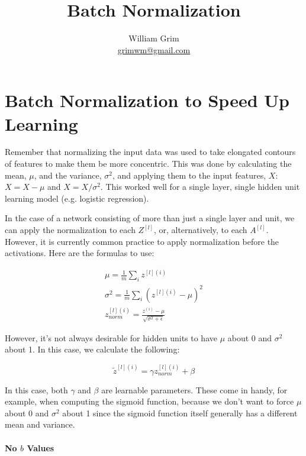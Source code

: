 \documentclass{article}
\begin{document}
\title {Batch Normalization}
\author{William Grim \\ \href{mailto:grimwm@gmail.com}{grimwm@gmail.com}}

\maketitle

\tableofcontents

\section{Batch Normalization to Speed Up Learning}

Remember that normalizing the input data was used to take elongated contours of features to make them be more concentric.  This was done by calculating the mean, $\mu$, and the variance, $\sigma^2$, and applying them to the input features, $X$: $X = X - \mu$ and $X = X / \sigma^2$.  This worked well for a single layer, single hidden unit learning model (e.g. logistic regression).

In the case of a network consisting of more than just a single layer and unit, we can apply the normalization to each $Z^{[l]}$, or, alternatively, to each $A^{[l]}$.  However, it is currently common practice to apply normalization before the activations.  Here are the formulas to use:

\begin{gather}
\mu = \frac{1}{m} \sum_i z^{[l](i)} \\
\sigma^2 = \frac{1}{m} \sum_i \left(z^{[l](i)} - \mu\right)^2 \\
z_{norm}^{[l](i)} = \frac{z^{(i)} - \mu}{\sqrt{\sigma^2 + \epsilon}}
\end{gather}

However, it's not always desirable for hidden units to have $\mu$ about 0 and $\sigma^2$ about 1.  In this case, we calculate the following:

\begin{equation}
\tilde{z}^{[l](i)} = \gamma z_{norm}^{[l](i)} + \beta
\end{equation}

In this case, both $\gamma$ and $\beta$ are learnable parameters.  These come in handy, for example, when computing the sigmoid function, because we don't want to force $\mu$ about 0 and $\sigma^2$ about 1 since the sigmoid function itself generally has a different mean and variance.

\paragraph{No $b$ Values}
\end{document}
